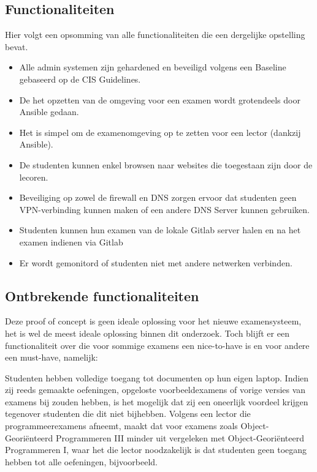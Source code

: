 \subsection{Functionaliteiten}

Hier volgt een opsomming van alle functionaliteiten die een dergelijke opstelling bevat.

\begin{itemize}
	\item Alle admin systemen zijn gehardened en beveiligd volgens een Baseline gebaseerd op de CIS Guidelines.
	\item De het opzetten van de omgeving voor een examen wordt grotendeels door Ansible gedaan.
	\item Het is simpel om de examenomgeving op te zetten voor een lector (dankzij Ansible). 
	\item De studenten kunnen enkel browsen naar websites die toegestaan zijn door de lecoren.
	\item Beveiliging op zowel de firewall en DNS zorgen ervoor dat studenten geen VPN-verbinding kunnen maken of een andere DNS Server kunnen gebruiken.
	\item Studenten kunnen hun examen van de lokale Gitlab server halen en na het examen indienen via Gitlab
	\item Er wordt gemonitord of studenten niet met andere netwerken verbinden.
\end{itemize}

\subsection{Ontbrekende functionaliteiten}

Deze proof of concept is geen ideale oplossing voor het nieuwe examensysteem, het is wel de meest ideale oplossing binnen dit onderzoek.
Toch blijft er een functionaliteit over die voor sommige examens een nice-to-have is en voor andere een must-have, namelijk: 

Studenten hebben volledige toegang tot documenten op hun eigen laptop. Indien zij reeds gemaakte oefeningen, opgeloste voorbeeldexamens of vorige versies van examens bij zouden hebben, is het mogelijk dat zij een oneerlijk voordeel krijgen tegenover studenten die dit niet bijhebben. Volgens een lector die programmeerexamens afneemt, maakt dat voor examens zoals Object-Geori\"{e}nteerd Programmeren III minder uit vergeleken met Object-Geori\"{e}nteerd Programmeren I, waar het die lector noodzakelijk is dat studenten geen toegang hebben tot alle oefeningen, bijvoorbeeld.

